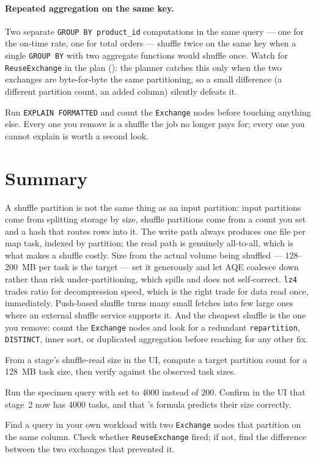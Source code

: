 \paragraph{Repeated aggregation on the same key.} Two separate
\texttt{GROUP BY product\_id} computations in the same query --- one for the
on-time rate, one for total orders --- shuffle twice on the same key when a
single \texttt{GROUP BY} with two aggregate functions would shuffle once. Watch
for \texttt{ReuseExchange} in the plan (): the planner
catches this only when the two exchanges are byte-for-byte the same
partitioning, so a small difference (a different partition count, an added
column) silently defeats it.

\begin{tip}
Run \texttt{EXPLAIN FORMATTED} and count the \texttt{Exchange} nodes before
touching anything else. Every one you remove is a shuffle the job no longer
pays for; every one you cannot explain is worth a second look.
\end{tip}

\section{Summary}
\label{sec:shuffle-summary}

A shuffle partition is not the same thing as an input partition: input
partitions come from splitting storage by size, shuffle partitions come from a
count you set and a hash that routes rows into it. The write path always
produces one file per map task, indexed by partition; the read path is
genuinely all-to-all, which is what makes a shuffle costly. Size
 from the actual volume being shuffled ---
128--200~MB per task is the target --- set it generously and let AQE coalesce
down rather than risk under-partitioning, which spills and does not self-correct.
\texttt{lz4} trades ratio for decompression speed, which is the right trade for
data read once, immediately. Push-based shuffle turns many small fetches into
few large ones where an external shuffle service supports it. And the cheapest
shuffle is the one you remove: count the \texttt{Exchange} nodes and look for a
redundant \texttt{repartition}, \texttt{DISTINCT}, inner sort, or duplicated
aggregation before reaching for any other fix.

\exercisehead
\begin{exercises}
\item From a stage's shuffle-read size in the UI, compute a target partition
      count for a 128~MB task size, then verify against the observed task sizes.
\item Run the specimen query with  set to 4000
      instead of 200. Confirm in the UI that stage~2 now has 4000 tasks, and that
      's formula predicts their size correctly.
\item Find a query in your own workload with two \texttt{Exchange} nodes that
      partition on the same column. Check whether \texttt{ReuseExchange} fired;
      if not, find the difference between the two exchanges that prevented it.
\end{exercises}
